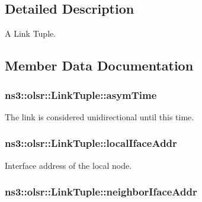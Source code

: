 \subsection{Detailed Description}
A Link Tuple. 

\subsection{Member Data Documentation}
\subsubsection[{\texorpdfstring{asym\+Time}{asymTime}}]{ ns3\+::olsr\+::\+Link\+Tuple\+::asym\+Time}\hypertarget{structns3_1_1olsr_1_1LinkTuple_ac8d4e5ae7c51626ae015419fa30dd059}{}\label{structns3_1_1olsr_1_1LinkTuple_ac8d4e5ae7c51626ae015419fa30dd059}


The link is considered unidirectional until this time. 

\subsubsection[{\texorpdfstring{local\+Iface\+Addr}{localIfaceAddr}}]{ ns3\+::olsr\+::\+Link\+Tuple\+::local\+Iface\+Addr}\hypertarget{structns3_1_1olsr_1_1LinkTuple_a338a610555f55dcd06dbc0d1794df537}{}\label{structns3_1_1olsr_1_1LinkTuple_a338a610555f55dcd06dbc0d1794df537}


Interface address of the local node. 

\subsubsection[{\texorpdfstring{neighbor\+Iface\+Addr}{neighborIfaceAddr}}]{ ns3\+::olsr\+::\+Link\+Tuple\+::neighbor\+Iface\+Addr}\hypertarget{structns3_1_1olsr_1_1LinkTuple_af96017826789616c7bf4f59a193f3939}{}\label{structns3_1_1olsr_1_1LinkTuple_af96017826789616c7bf4f59a193f3939}



